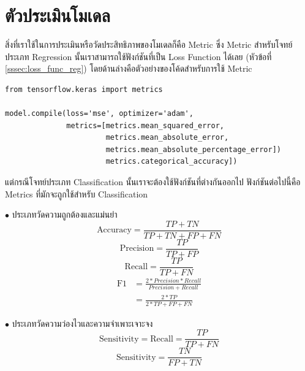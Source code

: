 \section{ตัวประเมินโมเดล}
\label{sec:metrics}

สิ่งที่เราใช้ในการประเมินหรือวัดประสิทธิภาพของโมเดลก็คือ Metric ซึ่ง Metric สำหรับโจทย์ประเภท Regression นั้นเราสามารถใช้ฟังก์ชันที่เป็น Loss Function ได้เลย (หัวข้อที่ \ref{sssec:loss_func_reg}) โดยด้านล่างคือตัวอย่างของโค้ดสำหรับการใช้ Metric

\begin{lstlisting}[style=MyPython]
from tensorflow.keras import metrics

model.compile(loss='mse', optimizer='adam',
              metrics=[metrics.mean_squared_error,
                       metrics.mean_absolute_error,
                       metrics.mean_absolute_percentage_error])
                       metrics.categorical_accuracy])
\end{lstlisting}

\vspace{1em}

แต่กรณีโจทย์ประเภท Classification นั้นเราจะต้องใช้ฟังก์ชันที่ต่างกันออกไป ฟังก์ชันต่อไปนี้คือ Metrics ที่มักจะถูกใช้สำหรับ Classification

\noindent $\bullet$ ประเภทวัดความถูกต้องและแม่นยำ
%
\begin{equation}
    \text{Accuracy} = \frac{TP+TN}{TP+TN+FP+FN}
\end{equation}
%
\begin{equation}
    \text{Precision} = \frac{TP}{TP+FP}
\end{equation}
%
\begin{equation}
    \text{Recall} = \frac{TP}{TP+FN}
\end{equation}
%
\begin{align}
    \text{F1} & = \frac{2*Precision*Recall}{Precision+Recall} \nonumber \\
              & = \frac{2*TP}{2*TP+FP+FN}
\end{align}

\noindent $\bullet$ ประเภทวัดความว่องไวและความจำเพาะเจาะจง
%
\begin{equation}
    \text{Sensitivity} = \text{Recall} = \frac{TP}{TP+FN}
\end{equation}
%
\begin{equation}
    \text{Sensitivity} = \frac{TN}{FP+TN}
\end{equation}

